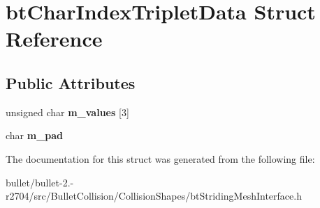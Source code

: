 \hypertarget{structbt_char_index_triplet_data}{\section{bt\+Char\+Index\+Triplet\+Data Struct Reference}
\label{structbt_char_index_triplet_data}
}
\subsection*{Public Attributes}
\begin{DoxyCompactItemize}
\item 
\hypertarget{structbt_char_index_triplet_data_a40dae9aab0fb193b3506b74986fbdb38}{unsigned char {\bfseries m\+\_\+values} \mbox{[}3\mbox{]}}\label{structbt_char_index_triplet_data_a40dae9aab0fb193b3506b74986fbdb38}

\item 
\hypertarget{structbt_char_index_triplet_data_a0da9daf74158d7dd7a2cd3f90ecd978c}{char {\bfseries m\+\_\+pad}}\label{structbt_char_index_triplet_data_a0da9daf74158d7dd7a2cd3f90ecd978c}

\end{DoxyCompactItemize}


The documentation for this struct was generated from the following file\+:\begin{DoxyCompactItemize}
\item 
bullet/bullet-\/2.-\/r2704/src/\+Bullet\+Collision/\+Collision\+Shapes/bt\+Striding\+Mesh\+Interface.\+h\end{DoxyCompactItemize}
